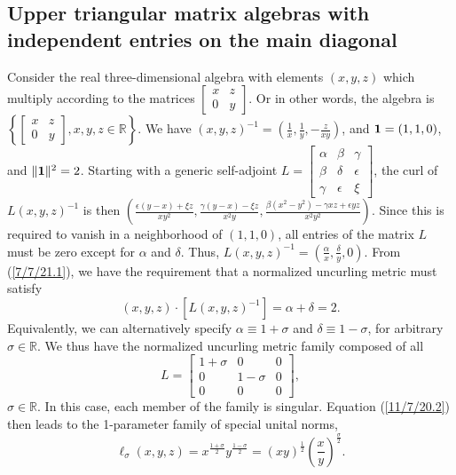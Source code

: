 \documentclass{amsart}
\numberwithin{equation}{section}
\theoremstyle{definition}
\numberwithin{theorem}{section}
\begin{document}
 \subsection{Upper triangular matrix algebras with independent entries on the main diagonal} Consider the real three-dimensional algebra with elements $(x,y,z)$ which multiply according to the matrices 
$\left[
\begin{array}{ccc}
 x & z   \\
 0 & y    
\end{array}
\right]$.  Or in other words, the algebra is $\left\{ \left[
\begin{array}{ccc}
 x & z   \\
 0 & y    
\end{array}
\right],x,y,z\in\mathbb{R}\right\}$.  We have $(x,y,z)^{-1} = \left( \frac{1}{x}, \frac{1}{y}, -\frac{z}{xy} \right)$, and ${\bf 1}= (1,1,0)$, and $\|{\bf 1}\|^2 = 2$.  Starting with a generic self-adjoint $L = \left[
\begin{array}{ccc}
 \alpha & \beta & \gamma   \\
 \beta & \delta & \epsilon \\ \gamma & \epsilon & \xi    
\end{array}
\right]$, 
the curl of $L(x,y,z)^{-1}$ is then $\left( \frac{\epsilon(y-x)+\xi z}{xy^2}, \frac{\gamma(y-x)-\xi z}{x^2y}, \frac{\beta(x^2-y^2)-\gamma x z +\epsilon y z}{x^2y^2}\right)$.  Since this is required to vanish in a neighborhood of $(1,1,0)$, all entries of the matrix $L$ must be zero except for $\alpha$ and $\delta$.   Thus, $L(x,y,z)^{-1} = (\frac{\alpha}{x}, \frac{\delta}{y},0)$.  From (\ref{7/7/21.1}), we have the requirement that a normalized uncurling metric must satisfy \[ (x,y,z)\cdot [L(x,y,z)^{-1}] = \alpha +\delta =  2.\]  Equivalently, we can alternatively specify $\alpha \equiv 1+\sigma$ and $\delta \equiv 1-\sigma$, for arbitrary $\sigma\in\mathbb{R}$.   We thus have the normalized uncurling metric family composed of all  \begin{equation}\label{11/17/22.2} L = \left[
\begin{array}{ccc}
 1+\sigma & 0 & 0   \\
 0 & 1-\sigma & 0 \\ 0 & 0 & 0    
\end{array}
\right],\end{equation} $\sigma\in\mathbb{R}$.  In this case, each member of the family is singular.  Equation (\ref{11/7/20.2}) then leads to the 1-parameter family of special unital norms, \begin{equation}\label{12/21/21.1} \ell_\sigma(x,y,z) = x^\frac{1+\sigma}{2} y^\frac{1-\sigma}{2} = (xy)^{\frac{1}{2}}\left(\frac{x}{y}\right)^{\frac{\sigma}{2}}.\end{equation} 
\end{document}
